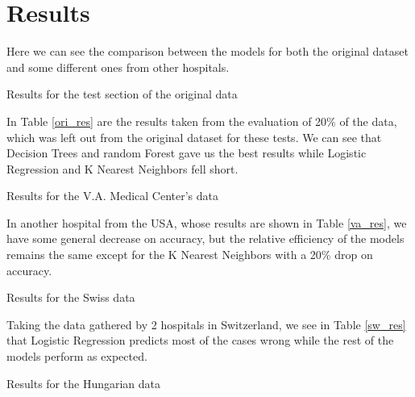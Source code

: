 \documentclass[conference]{IEEEtran}
\begin{document}
\section{Results}

Here we can see the comparison between the models for both the original dataset and some different ones from other hospitals.

\begin{table}[H]
    \caption{Results for the test section of the original data}
    \begin{center}
        
        \label{ori_res}
    \end{center}
\end{table}

In Table \ref{ori_res} are the results taken from the evaluation of 20\% of the data, which was left out from the original dataset for these tests. We can see that Decision Trees and random Forest gave us the best results while Logistic Regression and K Nearest Neighbors fell short.

\begin{table}[H]
    \caption{Results for the V.A. Medical Center's data}
    \begin{center}
        
        \label{va_res}
    \end{center}
\end{table}

In another hospital from the USA\cite{va}, whose results are shown in Table \ref{va_res}, we have some general decrease on accuracy, but the relative efficiency of the models remains the same except for the K Nearest Neighbors with a 20\% drop on accuracy.

\begin{table}[H]
    \caption{Results for the Swiss data}
    \begin{center}
        
        \label{sw_res}
    \end{center}
\end{table}

Taking the data gathered by 2 hospitals in Switzerland\cite{swz1,swz2}, we see in Table \ref{sw_res} that Logistic Regression predicts most of the cases wrong while the rest of the models perform as expected.

\begin{table}[H]
    \caption{Results for the Hungarian data}
    \begin{center}
        
        \label{hun_res}
    \end{center}
\end{table}
\end{document}
